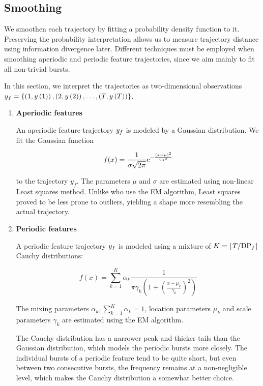 \subsection{Smoothing}

We smoothen each trajectory by fitting a probability density function to it. Preserving the probability interpretation allows us to measure trajectory distance using information divergence later. Different techniques must be employed when smoothing aperiodic and periodic feature trajectories, since we aim mainly to fit all non-trivial bursts.

In this section, we interpret the trajectories as two-dimensional observations $y_{f} = \{ \left( 1, y \left(1 \right) \right), \left( 2, y \left(2 \right) \right), \dots, \left( T, y \left(T \right) \right) \}$.

\begin{enumerate}

\item \textbf{Aperiodic features}

An aperiodic feature trajectory $y_{f}$ is modeled by a Gaussian distribution. We fit the Gaussian function

\begin{equation*}
	f(x) = \frac{1}{\sigma \sqrt{2 \pi}} \mathrm{e}^{-\frac{\left( x - \mu \right)^{2}}{2 \sigma^{2}}}
\end{equation*}

to the trajectory $y_{f}$. The parameters $\mu$ and $\sigma$ are estimated using non-linear Least squares method. Unlike \cite{event-detection} who use the EM algorithm, Least squares proved to be less prone to outliers, yielding a shape more resembling the actual trajectory.

\item \textbf{Periodic features}

A periodic feature trajectory $y_{f}$ is modeled using a mixture of $K = \lfloor T / \text{DP}_{f}\rfloor$ Cauchy distributions:

\begin{equation*}
	f(x) = \sum_{k = 1}^{K}{\alpha_{k} \frac{1}{\pi \gamma_{k} \left( 1 + \left( \frac{x - \mu_{k}}{\gamma_{k}} \right)^2 \right)}}
\end{equation*}

The mixing parameters $\alpha_{k}, \sum_{k = 1}^{K}{\alpha_{k}} = 1$, location parameters $\mu_{k}$ and scale parameters $\gamma_{k}$ are estimated using the EM algorithm.

The Cauchy distribution has a narrower peak and thicker tails than the Gaussian distribution, which models the periodic bursts more closely. The individual bursts of a periodic feature tend to be quite short, but even between two consecutive bursts, the frequency remains at a non-negligible level, which makes the Cauchy distribution a somewhat better choice.

\end{enumerate}


